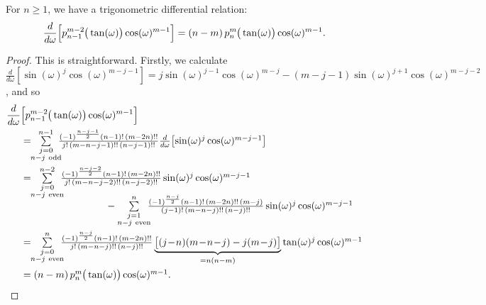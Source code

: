 \begin{lemma} \label{trigonometric}
For $n\geq 1$, we have a trigonometric differential relation:
\begin{equation*}
\frac{d}{d\omega} \Big[p_{n-1}^{m-2}\;\!\!\big(\tan(\omega)\big)\cos(\omega)^{m-1} \Big]= (n-m)\, p_{n}^{m}\;\!\!\big(\tan(\omega)\big)\cos(\omega)^{m-1}.
\end{equation*} 
\end{lemma}
\begin{proof} This is straightforward.
Firstly, we calculate $ \frac{d}{d\omega}\! \left[\sin(\omega)^j \cos(\omega)^{m-j-1}\right] = j \sin(\omega)^{j-1} \cos(\omega)^{m-j}-(m\!-\!j\!-\!1)\sin(\omega)^{j+1} \cos(\omega)^{m-j-2}$, and so
\begin{align*}%
\frac{d}{d\omega} &\Big[\pol{n-1}{m-2}\big(\tan(\omega)\big)\cos(\omega)^{m-1} \Big] 
\\&=\!\! \textstyle \sum\limits_{\substack{j=0\\ n-j\ \text{odd}}}^{n-1} \!\!\!\frac{(-1)^{\frac{n-j-1}{2}}  (n-1)!\,(m-2n)!!}{j!\,(m-n-j-1)!!\,(n-j-1)!!}\frac{d}{d\omega}\! \left[\sin(\omega)^j \cos(\omega)^{m-j-1}\right]
\\ &=\!\!\textstyle\sum\limits_{\substack{j=0\\ n-j\ \text{even}}}^{n-2} \!\!\!\frac{(-1)^{\frac{n-j-2}{2}}(n-1)!\,(m-2n)!!}{j!\,(m-n-j-2)!!\,(n-j-2)!!}\sin(\omega)^{j} \cos(\omega)^{m-j-1} \\[-3mm]
&\hspace{3cm}-\textstyle\sum\limits_{\substack{j=1\\ n-j\ \text{even}}}^{n}\!\!\! \frac{(-1)^{\frac{n-j}{2}}(n-1)!\,(m-2n)!!\,(m-j)}{(j-1)!\,(m-n-j)!!\,(n-j)!!}\sin(\omega)^{j} \cos(\omega)^{m-j-1} \\
&=\!\!\textstyle\sum\limits_{\substack{j=0\\ n-j\ \text{even}}}^{n} \!\!\!\frac{(-1)^{\frac{n-j}{2}}(n-1)!\,(m-2n)!!}{j!\,(m-n-j)!!\,(n-j)!!}\underbrace{\big[(j\!-\!n)(m\!-\!n\!-\!j)-j(m\!-\!j)\big] }_{=n(n-m)}\tan(\omega)^{j} \cos(\omega)^{m-1}
\\ &= \textstyle(n-m)\, \pol{n}{m}\big(\tan(\omega)\big)\cos(\omega)^{m-1}. \qedhere
\end{align*} 
\end{proof}

